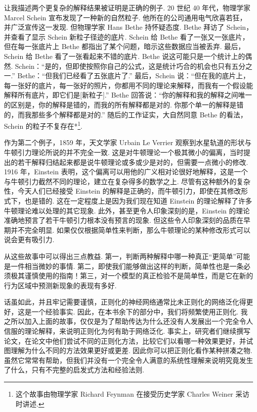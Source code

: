 让我描述两个更复杂的解释结果被证明是正确的例子. 20 世纪 40 年代，物理学家 Marcel Schein 宣布发现了一种新的自然粒子. 他所在的公司通用电气欣喜若狂，并广泛宣传这一发现. 但物理学家 Hans Bethe 持怀疑态度. Bethe 拜访了 Schein，并查看了显示 Schein 新粒子径迹的底片. Schein 给 Bethe 看了一张又一张底片，但在每一张底片上 Bethe 都指出了某个问题，暗示这些数据应当被丢弃. 最后，Schein 给 Bethe 看了一张看起来不错的底片. Bethe 说这可能只是一个统计上的偶然. Schein：``是的，但即使按照你自己的公式，这是统计巧合的机会也只有五分之一.'' Bethe：``但我们已经看了五张底片了.'' 最后，Schein 说：``但在我的底片上，每一张好的底片，每一张好的照片，你都用不同的理论来解释，而我有一个假设能解释所有底片，即它们是[新粒子].'' Bethe 回答说：``你的解释和我的解释之间唯一的区别是，你的解释是错的，而我的所有解释都是对的. 你那个单一的解释是错的，而我那些多个解释都是对的.'' 随后的工作证实，大自然同意 Bethe 的看法，Schein 的粒子不复存在*\footnote{这个故事由物理学家 Richard Feynman 在接受历史学家 Charles Weiner 采访时讲述.}.

作为第二个例子，1859 年，天文学家 Urbain Le Verrier 观察到水星轨道的形状与牛顿引力理论所说的并不完全一致. 这是对牛顿理论一个极其微小的偏离，当时提出的若干解释归结起来都是说牛顿理论或多或少是对的，但需要一点微小的修改. 1916 年，Einstein 表明，这个偏离可以用他的广义相对论很好地解释，这是一个与牛顿引力截然不同的理论，建立在复杂得多的数学之上. 尽管有这种额外的复杂性，今天人们已经接受 Einstein 的解释是正确的，而牛顿引力，即使在其修改形式下，也是错的. 这在一定程度上是因为我们现在知道 Einstein 的理论解释了许多牛顿理论难以处理的其它现象. 此外，甚至更令人印象深刻的是，Einstein 的理论准确地预言了若干牛顿引力根本没有预言的现象. 但这些令人印象深刻的品质在早期并不完全明显. 如果仅仅根据简单性来判断，那么牛顿理论的某种修改形式可以说会更有吸引力.

从这些故事中可以得出三点教益. 第一，判断两种解释中哪一种真正``更简单''可能是一件相当微妙的事情. 第二，即使我们能够做出这样的判断，简单性也是一条必须极其谨慎使用的指南！第三，对一个模型的真正检验不是简单性，而是它在新的行为区域中预测新现象的表现有多好.

话虽如此，并且牢记需要谨慎，正则化的神经网络通常比未正则化的网络泛化得更好，这是一个经验事实. 因此，在本书余下的部分中，我们将频繁使用正则化. 我之所以加入上面的故事，仅仅是为了帮助传达为什么还没有人发展出一个完全令人信服的理论解释，来说明正则化为何有助于网络泛化. 事实上，研究者们继续撰写论文，在论文中他们尝试不同的正则化方法，比较它们以看哪一种效果更好，并试图理解为什么不同的方法效果更好或更差. 因此你可以把正则化看作某种拼凑之物. 虽然它常常有帮助，但我们并没有一个完全令人满意的系统性理解来说明究竟发生了什么，只有不完整的启发式方法和经验法则.

